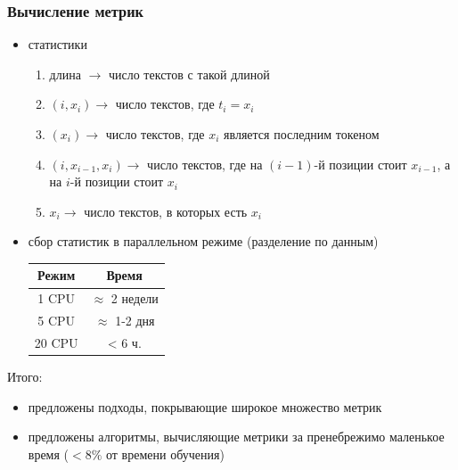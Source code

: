 \documentclass{beamer}
\begin{document}
\begin{frame}
	\frametitle{Вычисление метрик}
	\begin{itemize}
		\item статистики
			\begin{enumerate}
				\item длина $\rightarrow$ число текстов с такой длиной
				\item $(i, x_i) \rightarrow$ число текстов, где $t_i = x_i$ 
				\item $(x_i)\rightarrow$ число текстов, где $x_i$ является последним токеном
				\item $(i, x_{i-1}, x_i) \rightarrow$ число текстов, где на $(i-1)$-й позиции стоит $x_{i-1}$, а на $i$-й позиции стоит $x_i$
				\item $x_i \rightarrow$ число текстов, в которых есть $x_i$
			\end{enumerate}
		\item сбор статистик в параллельном режиме (разделение по данным)
			\begin{table}
				\begin{tabular}{|c|c|}
					\hline
					Режим & Время \\
					\hline
					1 CPU & $\approx$ 2 недели \\
					5 CPU & $\approx$ 1-2 дня \\
					20 CPU & < 6 ч. \\
					\hline
				\end{tabular}
			\end{table}
	\end{itemize}
	\noindent\makebox[\linewidth]{\rule{\paperwidth}{0.4pt}}
	Итого:
	\begin{itemize}
		\item предложены подходы, покрывающие широкое множество метрик
		\item предложены алгоритмы, вычисляющие метрики за пренебрежимо маленькое время ($<8\%$ от времени обучения)
	\end{itemize}
\end{frame}
\end{document}
